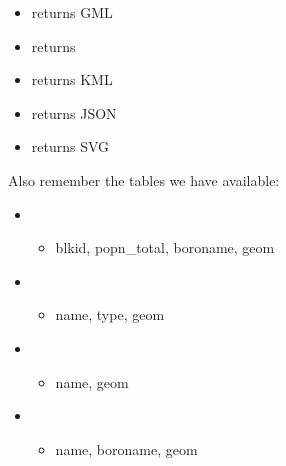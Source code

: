 \documentclass[a4paper,11pt,english]{sphinxmanual}
\begin{document}
\begin{itemize}
\item {} 
 returns GML 

\item {} 
 returns 

\item {} 
 returns KML 

\item {} 
 returns JSON 

\item {} 
 returns SVG 

\end{itemize}

Also remember the tables we have available:
\begin{itemize}
\item {} 
\begin{itemize}
\item {} 
blkid, popn\_total, boroname, geom

\end{itemize}

\item {} 
\begin{itemize}
\item {} 
name, type, geom

\end{itemize}

\item {} 
\begin{itemize}
\item {} 
name, geom

\end{itemize}

\item {} 
\begin{itemize}
\item {} 
name, boroname, geom

\end{itemize}

\end{itemize}
\end{document}
